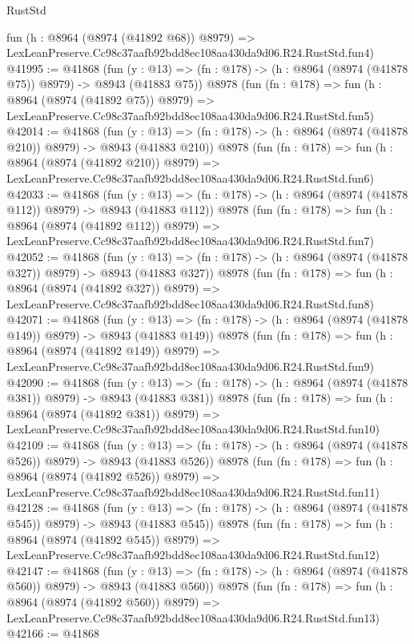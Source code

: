 \begin{lexlean}{RustStd}
\begin{coremodule}
    fun (h : @8964 (@8974 (@41892 @68)) @8979) =>
    LexLeanPreserve.Cc98c37aafb92bdd8ec108aa430da9d06.R24.RustStd.fun4)
@41995 := @41868
    (fun (y : @13) => (fn : @178) -> (h : @8964 (@8974 (@41878 @75)) @8979) -> @8943 (@41883 @75))
    @8978
    (fun (fn : @178) =>
    fun (h : @8964 (@8974 (@41892 @75)) @8979) =>
    LexLeanPreserve.Cc98c37aafb92bdd8ec108aa430da9d06.R24.RustStd.fun5)
@42014 := @41868
    (fun (y : @13) => (fn : @178) -> (h : @8964 (@8974 (@41878 @210)) @8979) -> @8943 (@41883 @210))
    @8978
    (fun (fn : @178) =>
    fun (h : @8964 (@8974 (@41892 @210)) @8979) =>
    LexLeanPreserve.Cc98c37aafb92bdd8ec108aa430da9d06.R24.RustStd.fun6)
@42033 := @41868
    (fun (y : @13) => (fn : @178) -> (h : @8964 (@8974 (@41878 @112)) @8979) -> @8943 (@41883 @112))
    @8978
    (fun (fn : @178) =>
    fun (h : @8964 (@8974 (@41892 @112)) @8979) =>
    LexLeanPreserve.Cc98c37aafb92bdd8ec108aa430da9d06.R24.RustStd.fun7)
@42052 := @41868
    (fun (y : @13) => (fn : @178) -> (h : @8964 (@8974 (@41878 @327)) @8979) -> @8943 (@41883 @327))
    @8978
    (fun (fn : @178) =>
    fun (h : @8964 (@8974 (@41892 @327)) @8979) =>
    LexLeanPreserve.Cc98c37aafb92bdd8ec108aa430da9d06.R24.RustStd.fun8)
@42071 := @41868
    (fun (y : @13) => (fn : @178) -> (h : @8964 (@8974 (@41878 @149)) @8979) -> @8943 (@41883 @149))
    @8978
    (fun (fn : @178) =>
    fun (h : @8964 (@8974 (@41892 @149)) @8979) =>
    LexLeanPreserve.Cc98c37aafb92bdd8ec108aa430da9d06.R24.RustStd.fun9)
@42090 := @41868
    (fun (y : @13) => (fn : @178) -> (h : @8964 (@8974 (@41878 @381)) @8979) -> @8943 (@41883 @381))
    @8978
    (fun (fn : @178) =>
    fun (h : @8964 (@8974 (@41892 @381)) @8979) =>
    LexLeanPreserve.Cc98c37aafb92bdd8ec108aa430da9d06.R24.RustStd.fun10)
@42109 := @41868
    (fun (y : @13) => (fn : @178) -> (h : @8964 (@8974 (@41878 @526)) @8979) -> @8943 (@41883 @526))
    @8978
    (fun (fn : @178) =>
    fun (h : @8964 (@8974 (@41892 @526)) @8979) =>
    LexLeanPreserve.Cc98c37aafb92bdd8ec108aa430da9d06.R24.RustStd.fun11)
@42128 := @41868
    (fun (y : @13) => (fn : @178) -> (h : @8964 (@8974 (@41878 @545)) @8979) -> @8943 (@41883 @545))
    @8978
    (fun (fn : @178) =>
    fun (h : @8964 (@8974 (@41892 @545)) @8979) =>
    LexLeanPreserve.Cc98c37aafb92bdd8ec108aa430da9d06.R24.RustStd.fun12)
@42147 := @41868
    (fun (y : @13) => (fn : @178) -> (h : @8964 (@8974 (@41878 @560)) @8979) -> @8943 (@41883 @560))
    @8978
    (fun (fn : @178) =>
    fun (h : @8964 (@8974 (@41892 @560)) @8979) =>
    LexLeanPreserve.Cc98c37aafb92bdd8ec108aa430da9d06.R24.RustStd.fun13)
@42166 := @41868

\end{coremodule}
\end{lexlean}
